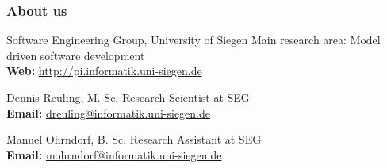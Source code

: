 \begingroup
\makeatletter
{}
\makeatother
\begin{frame}
\frametitle{About us}
\begin{block}{Software Engineering Group, University of Siegen}
Main research area: Model driven software development \\
\medskip
\textbf{Web:} \url{http://pi.informatik.uni-siegen.de}
\end{block}
\begin{block}{Dennis Reuling, M. Sc.}
Research Scientist at SEG\\
\medskip
\textbf{Email:} \url{dreuling@informatik.uni-siegen.de}

\end{block}
\begin{block}{Manuel Ohrndorf, B. Sc.}
Research Assistant at SEG \\
\medskip
\textbf{Email:} \url{mohrndorf@informatik.uni-siegen.de}
\end{block}
\end{frame}
\endgroup
